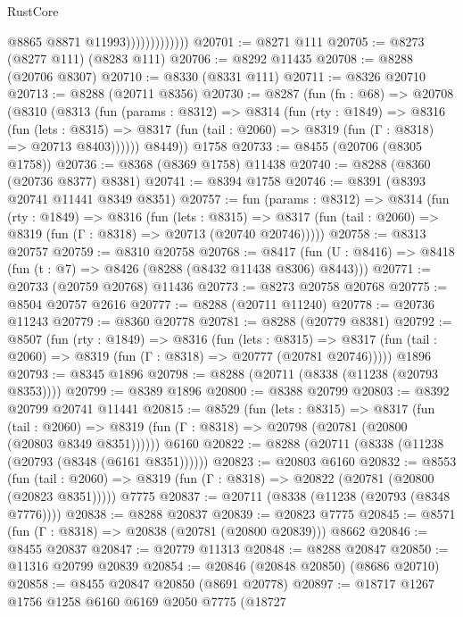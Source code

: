 \begin{lexlean}{RustCore}
\begin{coremodule}
                              @8865
                              @8871
                              @11993)))))))))))))
@20701 := @8271 @111
@20705 := @8273 (@8277 @111) (@8283 @111)
@20706 := @8292 @11435
@20708 := @8288 (@20706 @8307)
@20710 := @8330 (@8331 @111)
@20711 := @8326 @20710
@20713 := @8288 (@20711 @8356)
@20730 := @8287
    (fun (fn : @68) =>
    @20708
      (@8310
        (@8313
          (fun (params : @8312) =>
          @8314
            (fun (rty : @1849) =>
            @8316
              (fun (lets : @8315) =>
              @8317 (fun (tail : @2060) => @8319 (fun (Γ : @8318) => @20713 @8403))))))
        @8449))
    @1758
@20733 := @8455 (@20706 (@8305 @1758))
@20736 := @8368 (@8369 @1758) @11438
@20740 := @8288 (@8360 (@20736 @8377) @8381)
@20741 := @8394 @1758
@20746 := @8391 (@8393 @20741 @11441 @8349 @8351)
@20757 := fun (params : @8312) =>
  @8314
    (fun (rty : @1849) =>
    @8316
      (fun (lets : @8315) =>
      @8317 (fun (tail : @2060) => @8319 (fun (Γ : @8318) => @20713 (@20740 @20746)))))
@20758 := @8313 @20757
@20759 := @8310 @20758
@20768 := @8417
    (fun (U : @8416) => @8418 (fun (t : @7) => @8426 (@8288 (@8432 @11438 @8306) @8443)))
@20771 := @20733 (@20759 @20768) @11436
@20773 := @8273 @20758 @20768
@20775 := @8504 @20757 @2616
@20777 := @8288 (@20711 @11240)
@20778 := @20736 @11243
@20779 := @8360 @20778
@20781 := @8288 (@20779 @8381)
@20792 := @8507
    (fun (rty : @1849) =>
    @8316
      (fun (lets : @8315) =>
      @8317 (fun (tail : @2060) => @8319 (fun (Γ : @8318) => @20777 (@20781 @20746)))))
    @1896
@20793 := @8345 @1896
@20798 := @8288 (@20711 (@8338 (@11238 (@20793 @8353))))
@20799 := @8389 @1896
@20800 := @8388 @20799
@20803 := @8392 @20799 @20741 @11441
@20815 := @8529
    (fun (lets : @8315) =>
    @8317
      (fun (tail : @2060) =>
      @8319 (fun (Γ : @8318) => @20798 (@20781 (@20800 (@20803 @8349 @8351))))))
    @6160
@20822 := @8288 (@20711 (@8338 (@11238 (@20793 (@8348 (@6161 @8351))))))
@20823 := @20803 @6160
@20832 := @8553
    (fun (tail : @2060) => @8319 (fun (Γ : @8318) => @20822 (@20781 (@20800 (@20823 @8351)))))
    @7775
@20837 := @20711 (@8338 (@11238 (@20793 (@8348 @7776))))
@20838 := @8288 @20837
@20839 := @20823 @7775
@20845 := @8571 (fun (Γ : @8318) => @20838 (@20781 (@20800 @20839))) @8662
@20846 := @8455 @20837
@20847 := @20779 @11313
@20848 := @8288 @20847
@20850 := @11316 @20799 @20839
@20854 := @20846 (@20848 @20850) (@8686 @20710)
@20858 := @8455 @20847 @20850 (@8691 @20778)
@20897 := @18717
    @1267
    @1756
    @1258
    @6160
    @6169
    @2050
    @7775
    (@18727

\end{coremodule}
\end{lexlean}
